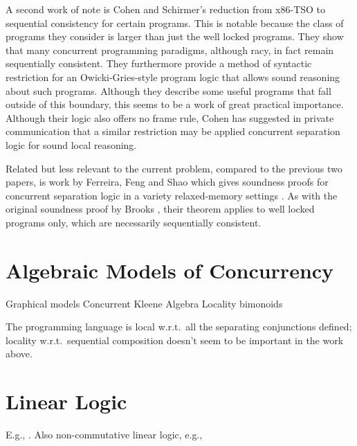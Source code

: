 \documentclass[11pt]{report}
\begin{document}
A second work of note is Cohen and Schirmer's \cite{DBLP:conf/itp/CohenS10} reduction from x86-TSO to sequential consistency for certain programs. This is notable because the class of programs they consider is larger than just the well locked programs. They show that many concurrent programming paradigms, although racy, in fact remain sequentially consistent. They furthermore provide a method of syntactic restriction for an Owicki-Gries-style program logic that allows sound reasoning about such programs. Although they describe some useful programs that fall outside of this boundary, this seems to be a work of great practical importance. Although their logic also offers no frame rule, Cohen has suggested in private communication that a similar restriction may be applied concurrent separation logic for sound local reasoning.

Related but less relevant to the current problem, compared to the previous two papers, is work by Ferreira, Feng and Shao which gives soundness proofs for concurrent separation logic in a variety relaxed-memory settings \cite{DBLP:conf/esop/FerreiraFS10}. As with the original soundness proof by Brooks \cite{DBLP:journals/tcs/Brookes07}, their theorem applies to well locked programs only, which are necessarily sequentially consistent. 

\section{Algebraic Models of Concurrency}

Graphical models \cite{DBLP:journals/ipl/WehrmanHO09} Concurrent Kleene Algebra \cite{DBLP:conf/RelMiCS/HoareMSW09,DBLP:conf/concur/HoareMSW09} Locality bimonoids \cite{DBLP:conf/concur/HoareHMOPS11} 

The programming language is local w.r.t.\ all the separating conjunctions defined; locality w.r.t.\ sequential composition doesn't seem to be important in the work above.  


\section{Linear Logic}

E.g., \cite{Girard95logic}. Also non-commutative linear logic, e.g., \cite{DBLP:conf/tlca/RetoreL97}
\end{document}
